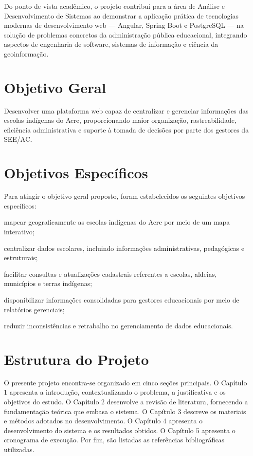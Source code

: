 \documentclass[12pt,a4paper,oneside]{abntspiifac}
\begin{document}
Do ponto de vista acadêmico, o projeto contribui para a área de Análise e Desenvolvimento de Sistemas ao demonstrar a aplicação prática de tecnologias modernas de desenvolvimento web — Angular, Spring Boot e PostgreSQL — na solução de problemas concretos da administração pública educacional, integrando aspectos de engenharia de software, sistemas de informação e ciência da geoinformação.

\section{Objetivo Geral}
\label{sec:objetivogeral}

Desenvolver uma plataforma web capaz de centralizar e gerenciar informações das escolas indígenas do Acre, proporcionando maior organização, rastreabilidade, eficiência administrativa e suporte à tomada de decisões por parte dos gestores da SEE/AC.

\section{Objetivos Específicos}
\label{sec:objetivosespecificos}

Para atingir o objetivo geral proposto, foram estabelecidos os seguintes objetivos específicos:

\begin{alineas}
  \item mapear geograficamente as escolas indígenas do Acre por meio de um mapa interativo;
  \item centralizar dados escolares, incluindo informações administrativas, pedagógicas e estruturais;
  \item facilitar consultas e atualizações cadastrais referentes a escolas, aldeias, municípios e terras indígenas;
  \item disponibilizar informações consolidadas para gestores educacionais por meio de relatórios gerenciais;
  \item reduzir inconsistências e retrabalho no gerenciamento de dados educacionais.
\end{alineas}

\section{Estrutura do Projeto}

O presente projeto encontra-se organizado em cinco seções principais. O Capítulo 1 apresenta a introdução, contextualizando o problema, a justificativa e os objetivos do estudo. O Capítulo 2 desenvolve a revisão de literatura, fornecendo a fundamentação teórica que embasa o sistema. O Capítulo 3 descreve os materiais e métodos adotados no desenvolvimento. O Capítulo 4 apresenta o desenvolvimento do sistema e os resultados obtidos. O Capítulo 5 apresenta o cronograma de execução. Por fim, são listadas as referências bibliográficas utilizadas.
\end{document}
